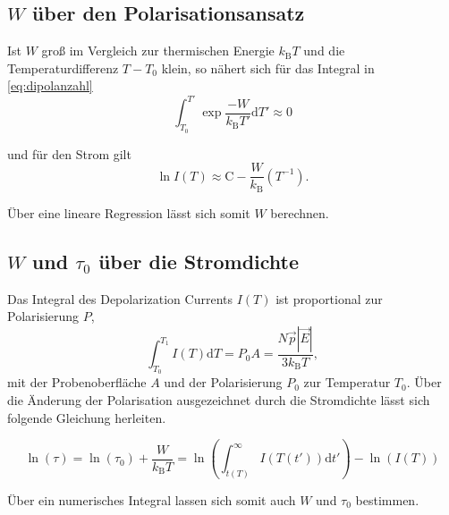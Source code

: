 \subsection{\(W\) über den Polarisationsansatz}

Ist $W$ groß im Vergleich zur thermischen Energie $k_\text{B}T$ und die Temperaturdifferenz $T - T_0$ klein, so nähert sich für das Integral in \autoref{eq:dipolanzahl}
\begin{equation*}
    \int_{T_0}^{T'} \exp{\frac{-W}{k_\text{B}T'} \mathrm{d}}T' \approx 0
\end{equation*}

und für den Strom gilt
\begin{equation}
    \ln{I\left(T\right)} \approx \text{C} - \frac{W}{k_\text{B}} \left(T^{-1}\right).
    \label{eq:fit_polarisationsansatz}
\end{equation}

Über eine lineare Regression lässt sich somit $W$ berechnen. 




\subsection{\(W\) und \(\tau_0\) über die Stromdichte}
Das Integral des Depolarization Currents $I\left(T\right)$ ist proportional zur Polarisierung $P$,
\begin{equation*}
    \int_{T_0}^{T_1} I\left(T\right) \mathrm{d}T = P_0 A = \frac{N \vec{p} \left\lvert \vec{E} \right\rvert}{3k_\text{B}T},
\end{equation*}
mit der Probenoberfläche $A$ und der Polarisierung $P_0$ zur Temperatur $T_0$. Über die Änderung der Polarisation 
ausgezeichnet durch die Stromdichte lässt sich folgende Gleichung herleiten.

\begin{equation}
    \ln\left(\tau\right) = \ln\left(\tau_0\right) + \frac{W}{k_\text{B}T} = \ln\left(\int_{t(T)}^{\infty} I(T(t'))\mathrm{d}t'\right) - \ln\left(I(T)\right)
    \label{eq:fit_stromdichtenansatz}
\end{equation}

Über ein numerisches Integral lassen sich somit auch $W$ und $\tau_0$ bestimmen.